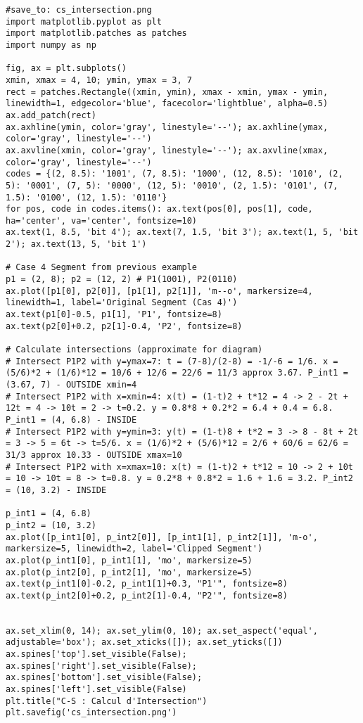 \documentclass{article}
\begin{document}
\begin{verbatim}
#save_to: cs_intersection.png
import matplotlib.pyplot as plt
import matplotlib.patches as patches
import numpy as np

fig, ax = plt.subplots()
xmin, xmax = 4, 10; ymin, ymax = 3, 7
rect = patches.Rectangle((xmin, ymin), xmax - xmin, ymax - ymin, linewidth=1, edgecolor='blue', facecolor='lightblue', alpha=0.5)
ax.add_patch(rect)
ax.axhline(ymin, color='gray', linestyle='--'); ax.axhline(ymax, color='gray', linestyle='--')
ax.axvline(xmin, color='gray', linestyle='--'); ax.axvline(xmax, color='gray', linestyle='--')
codes = {(2, 8.5): '1001', (7, 8.5): '1000', (12, 8.5): '1010', (2, 5): '0001', (7, 5): '0000', (12, 5): '0010', (2, 1.5): '0101', (7, 1.5): '0100', (12, 1.5): '0110'}
for pos, code in codes.items(): ax.text(pos[0], pos[1], code, ha='center', va='center', fontsize=10)
ax.text(1, 8.5, 'bit 4'); ax.text(7, 1.5, 'bit 3'); ax.text(1, 5, 'bit 2'); ax.text(13, 5, 'bit 1')

# Case 4 Segment from previous example
p1 = (2, 8); p2 = (12, 2) # P1(1001), P2(0110)
ax.plot([p1[0], p2[0]], [p1[1], p2[1]], 'm--o', markersize=4, linewidth=1, label='Original Segment (Cas 4)')
ax.text(p1[0]-0.5, p1[1], 'P1', fontsize=8)
ax.text(p2[0]+0.2, p2[1]-0.4, 'P2', fontsize=8)

# Calculate intersections (approximate for diagram)
# Intersect P1P2 with y=ymax=7: t = (7-8)/(2-8) = -1/-6 = 1/6. x = (5/6)*2 + (1/6)*12 = 10/6 + 12/6 = 22/6 = 11/3 approx 3.67. P_int1 = (3.67, 7) - OUTSIDE xmin=4
# Intersect P1P2 with x=xmin=4: x(t) = (1-t)2 + t*12 = 4 -> 2 - 2t + 12t = 4 -> 10t = 2 -> t=0.2. y = 0.8*8 + 0.2*2 = 6.4 + 0.4 = 6.8. P_int1 = (4, 6.8) - INSIDE
# Intersect P1P2 with y=ymin=3: y(t) = (1-t)8 + t*2 = 3 -> 8 - 8t + 2t = 3 -> 5 = 6t -> t=5/6. x = (1/6)*2 + (5/6)*12 = 2/6 + 60/6 = 62/6 = 31/3 approx 10.33 - OUTSIDE xmax=10
# Intersect P1P2 with x=xmax=10: x(t) = (1-t)2 + t*12 = 10 -> 2 + 10t = 10 -> 10t = 8 -> t=0.8. y = 0.2*8 + 0.8*2 = 1.6 + 1.6 = 3.2. P_int2 = (10, 3.2) - INSIDE

p_int1 = (4, 6.8)
p_int2 = (10, 3.2)
ax.plot([p_int1[0], p_int2[0]], [p_int1[1], p_int2[1]], 'm-o', markersize=5, linewidth=2, label='Clipped Segment')
ax.plot(p_int1[0], p_int1[1], 'mo', markersize=5)
ax.plot(p_int2[0], p_int2[1], 'mo', markersize=5)
ax.text(p_int1[0]-0.2, p_int1[1]+0.3, "P1'", fontsize=8)
ax.text(p_int2[0]+0.2, p_int2[1]-0.4, "P2'", fontsize=8)


ax.set_xlim(0, 14); ax.set_ylim(0, 10); ax.set_aspect('equal', adjustable='box'); ax.set_xticks([]); ax.set_yticks([])
ax.spines['top'].set_visible(False); ax.spines['right'].set_visible(False); ax.spines['bottom'].set_visible(False); ax.spines['left'].set_visible(False)
plt.title("C-S : Calcul d'Intersection")
plt.savefig('cs_intersection.png')
\end{verbatim}
\end{document}

